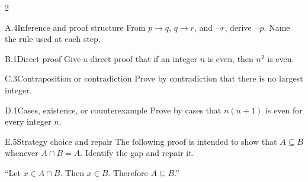 \documentclass[9pt]{extarticle}
\begin{document}
\begin{multicols}{2}
\begin{CoreProblem}{A.4}{Inference and proof structure}
From $p\to q$, $q\to r$, and $\neg r$, derive $\neg p$. Name the rule used at
each step.
\end{CoreProblem}
\begin{CoreProblem}{B.1}{Direct proof}
Give a direct proof that if an integer $n$ is even, then $n^2$ is even.
\end{CoreProblem}
\begin{CoreProblem}{C.3}{Contraposition or contradiction}
Prove by contradiction that there is no largest integer.
\end{CoreProblem}
\columnbreak
\begin{CoreProblem}{D.1}{Cases, existence, or counterexample}
Prove by cases that $n(n+1)$ is even for every integer $n$.
\end{CoreProblem}
\begin{CoreProblem}{E.5}{Strategy choice and repair}
The following proof is intended to show that $A\subseteq B$ whenever
$A\cap B=A$. Identify the gap and repair it.

``Let $x\in A\cap B$. Then $x\in B$. Therefore $A\subseteq B$.''
\end{CoreProblem}
\end{multicols}
\CoreWorkArea
\FormBreak
{}
\end{document}
